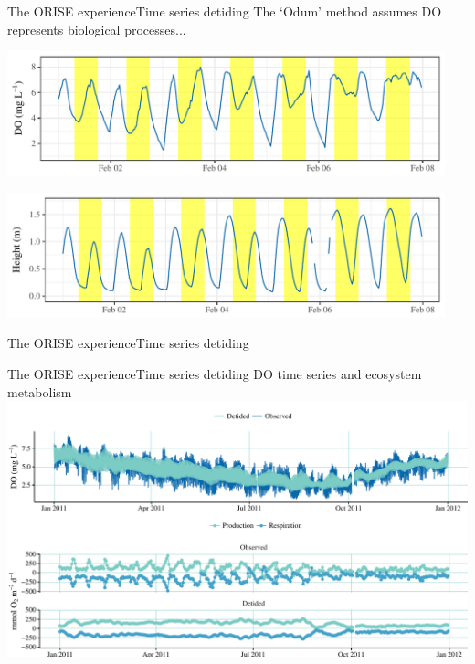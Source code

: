 \documentclass[serif]{beamer}\usepackage[]{graphicx}\usepackage[]{color}
\begin{document}
\begin{frame}{The ORISE experience}{Time series detiding}
The `Odum' method assumes DO represents biological processes...


{\centering \includegraphics[width=0.95\textwidth]{fig/sapdo-1} 

}





{\centering \includegraphics[width=0.95\textwidth]{fig/saptide-1} 

}



\end{frame}



\begin{frame}{The ORISE experience}{Time series detiding}
\begin{center}
\end{center}
\end{frame}

\begin{frame}{The ORISE experience}{Time series detiding}
DO time series and ecosystem metabolism {\footnotesize\cite{Beck15b}}
\includegraphics[width = \textwidth]{fig/metex.pdf}
\end{frame}
\end{document}
